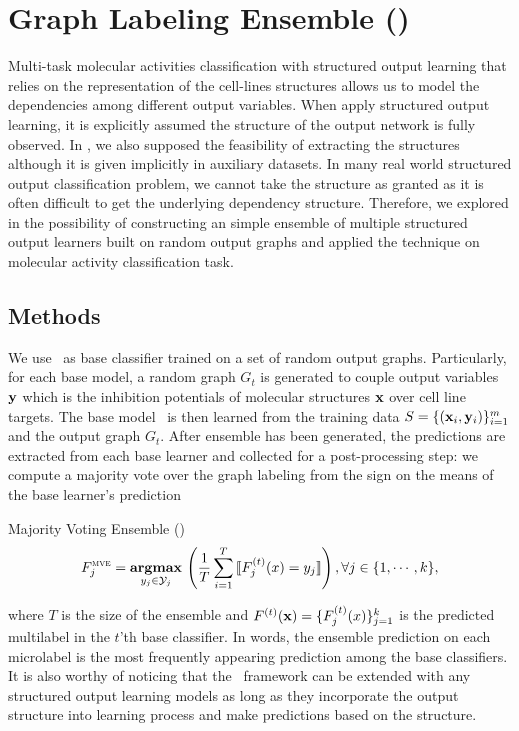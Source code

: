 {%
%
\section{Graph Labeling Ensemble (\mve)}

Multi-task molecular activities classification with structured output learning that relies on the representation of the cell-lines structures allows us to model the dependencies among different output variables.
When apply structured output learning, it is explicitly assumed the structure of the output network is fully observed.
In , we also supposed the feasibility of extracting the structures although it is given implicitly in auxiliary datasets.
In many real world structured output classification problem, we cannot take the structure as granted as it is often difficult to get the underlying dependency structure.
Therefore, we explored in  the possibility of constructing an simple ensemble of multiple structured output learners built on random output graphs and applied the technique on molecular activity classification task.

\subsection{Methods}

We use \mmcrf\ as base classifier trained on a set of random output graphs.
Particularly, for each base model, a random graph $G_t$ is generated to couple output variables $\mathbf {y}$ which is the inhibition potentials of molecular structures $\mathbf {x}$ over cell line targets.
The base model \mmcrf\ is then learned from the training data $S=\{(\mathbf {x}_i,\mathbf {y}_i)\}_{i=1}^{m}$ and the output graph $G_t$.
After ensemble has been generated, the predictions are extracted from each base learner and collected for a post-processing step: we compute a majority vote over the graph labeling from the sign on the means of the base learner's prediction
\begin{definition}{Majority Voting Ensemble (\mve)}
\begin{align*}
	F_j^{\text{{\sc mve}}}=\underset{y_j\in\mathcal{Y}_j}{\textbf{argmax}}\,\left(\frac{1}{T}\sum_{i=1}^{T}{\llbracket F_j^{(t)}(x)=y_j \rrbracket}\right), \forall j\in\{1,\cdots,k\},
\end{align*}
\end{definition}
where $T$ is the size of the ensemble and $F^{(t)}(\mathbf {x})=\{F^{(t)}_j(x)\}_{j=1}^{k}$ is the predicted multilabel in the $t$'th base classifier.
In words, the ensemble prediction on each microlabel is the most frequently appearing prediction among the base classifiers.
It is also worthy of noticing that the \mve\ framework can be extended with any structured output learning models as long as they incorporate the output structure into learning process and make predictions based on the structure.

}
